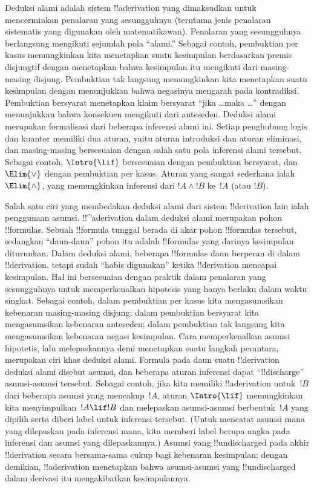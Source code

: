 \documentclass[../../../include/open-logic-section]{subfiles}
\begin{document}
      {}
      {}


Deduksi alami adalah sistem !!a{derivation} yang dimaksudkan untuk
mencerminkan penalaran yang sesungguhnya (terutama jenis penalaran
sistematis yang digunakan oleh matematikawan). Penalaran yang
sesungguhnya berlangsung mengikuti sejumlah pola ``alami.'' Sebagai
contoh, pembuktian per kasus memungkinkan kita menetapkan suatu
kesimpulan berdasarkan premis disjungtif dengan menetapkan bahwa
kesimpulan itu mengikuti dari masing-masing disjung. Pembuktian tak
langsung memungkinkan kita menetapkan suatu kesimpulan dengan
menunjukkan bahwa negasinya mengarah pada kontradiksi. Pembuktian
bersyarat menetapkan klaim bersyarat ``jika \dots maka \dots'' dengan
menunjukkan bahwa konsekuen mengikuti dari anteseden. Deduksi alami
merupakan formalisasi dari beberapa inferensi alami ini. Setiap
penghubung logis dan kuantor memiliki dua aturan, yaitu aturan
introduksi dan aturan eliminasi, dan masing-masing bersesuaian dengan
salah satu pola inferensi alami tersebut. Sebagai contoh,
$\Intro{\lif}$ bersesuaian dengan pembuktian bersyarat, dan
$\Elim{\lor}$ dengan pembuktian per kasus. Aturan yang sangat sederhana
ialah $\Elim{\land}$, yang memungkinkan inferensi dari $!A \land !B$
ke~$!A$ (atau $!B$).

Salah satu ciri yang membedakan deduksi alami dari sistem
!!{derivation} lain ialah penggunaan asumsi. !!^a{derivation} dalam
deduksi alami merupakan pohon !!{formula}s. Sebuah !!{formula}
tunggal berada di akar pohon !!{formula}s tersebut, sedangkan
``daun-daun'' pohon itu adalah !!{formula}s yang darinya kesimpulan
diturunkan. Dalam deduksi alami, beberapa !!{formula}s daun berperan
di dalam !!{derivation}, tetapi sudah ``habis digunakan'' ketika
!!{derivation} mencapai kesimpulan. Hal ini bersesuaian dengan praktik
dalam penalaran yang sesungguhnya untuk memperkenalkan hipotesis yang
hanya berlaku dalam waktu singkat. Sebagai contoh, dalam pembuktian
per kasus kita mengasumsikan kebenaran masing-masing disjung; dalam
pembuktian bersyarat kita mengasumsikan kebenaran anteseden; dalam
pembuktian tak langsung kita mengasumsikan kebenaran negasi
kesimpulan. Cara memperkenalkan asumsi hipotetis, lalu melepaskannya
demi menetapkan suatu langkah perantara, merupakan ciri khas deduksi
alami. Formula pada daun suatu !!{derivation} deduksi alami
disebut asumsi, dan beberapa aturan inferensi dapat
``!!{discharge}'' asumsi-asumsi tersebut. Sebagai contoh, jika kita
memiliki !!a{derivation} untuk~$!B$ dari beberapa asumsi yang
mencakup~$!A$, aturan $\Intro{\lif}$ memungkinkan kita
menyimpulkan~$!A \lif !B$ dan melepaskan asumsi-asumsi berbentuk~$!A$
yang dipilih serta diberi label untuk inferensi tersebut.
(Untuk mencatat asumsi mana yang dilepaskan pada inferensi mana, kita
memberi label berupa angka pada inferensi dan asumsi yang
dilepaskannya.) Asumsi yang !!{undischarged} pada akhir
!!{derivation} secara bersama-sama cukup bagi kebenaran kesimpulan;
dengan demikian, !!a{derivation} menetapkan bahwa asumsi-asumsi yang
!!{undischarged} dalam derivasi itu mengakibatkan kesimpulannya.
\end{document}
